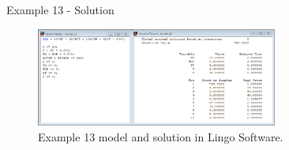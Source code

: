 \begin{frame}{Example 13 - Solution}
\begin{figure}
    \includegraphics[width=300px]{slides/ex13/screenshot.png}
    \caption{Example 13 model and solution in Lingo Software.}
\end{figure}
\end{frame}
